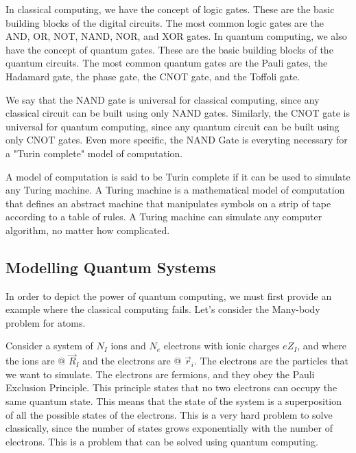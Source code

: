 \documentclass[10pt]{article}
\numberwithin{equation}{section}
\theoremstyle{defi}
\begin{document}
In classical computing, we have the concept of logic gates. These are the basic building blocks of the digital circuits. The most common logic gates are the AND, OR, NOT, NAND, NOR, and XOR gates. In quantum computing, we also have the concept of quantum gates. These are the basic building blocks of the quantum circuits. The most common quantum gates are the Pauli gates, the Hadamard gate, the phase gate, the CNOT gate, and the Toffoli gate.

We say that the NAND gate is universal for classical computing, since any classical circuit can be built using only NAND gates. Similarly, the CNOT gate is universal for quantum computing, since any quantum circuit can be built using only CNOT gates. Even more specific, the NAND Gate is everyting necessary for a "Turin complete" model of computation.

\begin{definitionii}
  A model of computation is said to be Turin complete if it can be used to simulate any Turing machine. A Turing machine is a mathematical model of computation that defines an abstract machine that manipulates symbols on a strip of tape according to a table of rules. A Turing machine can simulate any computer algorithm, no matter how complicated.
\end{definitionii}

\subsection{Modelling Quantum Systems}
In order to depict the power of quantum computing, we must first provide an example where the classical computing fails. Let's consider the Many-body problem for atoms.

Consider a system of $N_I$ ions and $N_e$ electrons with ionic charges $eZ_I$, and where the ions are @ $\vec{R}_I$ and the electrons are @ $\vec{r}_i$. The electrons are the particles that we want to simulate. The electrons are fermions, and they obey the Pauli Exclusion Principle. This principle states that no two electrons can occupy the same quantum state. This means that the state of the system is a superposition of all the possible states of the electrons. This is a very hard problem to solve classically, since the number of states grows exponentially with the number of electrons. This is a problem that can be solved using quantum computing.
\end{document}

